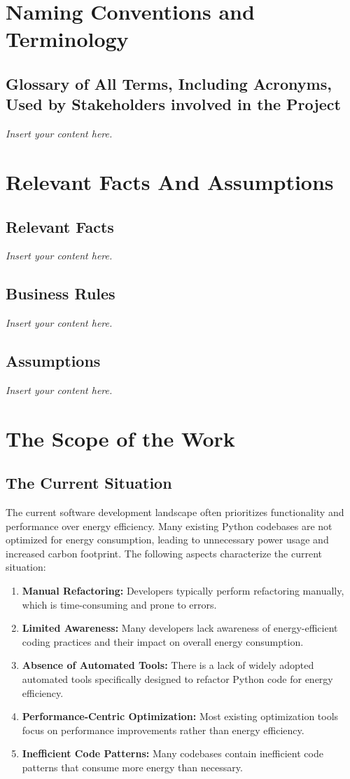 \documentclass[12pt]{article}
\newcommand{\lips}{\textit{Insert your content here.}}
\begin{document}
\section{Naming Conventions and Terminology}
\subsection{Glossary of All Terms, Including Acronyms, Used by Stakeholders
involved in the Project}
\lips

\section{Relevant Facts And Assumptions}
\subsection{Relevant Facts}
\lips
\subsection{Business Rules}
\lips
\subsection{Assumptions}
\lips

\section{The Scope of the Work}
\subsection{The Current Situation}

  The current software development landscape often prioritizes functionality and performance over energy efficiency. Many existing Python codebases are not optimized for energy consumption, leading to unnecessary power usage and increased carbon footprint. The following aspects characterize the current situation:
  \begin{enumerate}
    \item \textbf{Manual Refactoring:} Developers typically perform refactoring manually, which is time-consuming and prone to errors.
    \item \textbf{Limited Awareness:} Many developers lack awareness of energy-efficient coding practices and their impact on overall energy consumption.
    \item \textbf{Absence of Automated Tools:} There is a lack of widely adopted automated tools specifically designed to refactor Python code for energy efficiency.
    \item \textbf{Performance-Centric Optimization:} Most existing optimization tools focus on performance improvements rather than energy efficiency.
    \item \textbf{Inefficient Code Patterns:} Many codebases contain inefficient code patterns that consume more energy than necessary.
  \end{enumerate}
\end{document}
